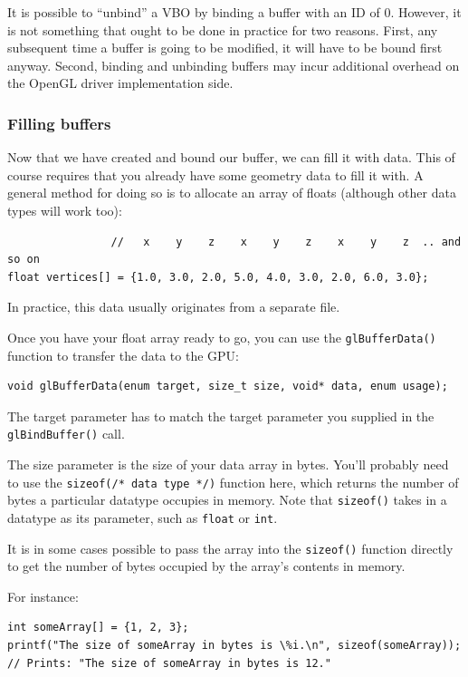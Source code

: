 It is possible to ``unbind'' a VBO by binding a buffer with an ID of 0. However, it is not something that ought to be done in practice for two reasons. First, any subsequent time a buffer is going to be modified, it will have to be bound first anyway. Second, binding and unbinding buffers may incur additional overhead on the OpenGL driver implementation side.

\subsubsection{Filling buffers}

Now that we have created and bound our buffer, we can fill it with data. This of course requires that you already have some geometry data to fill it with. A general method for doing so is to allocate an array of floats (although other data types will work too):
\begin{verbatim}
                //   x    y    z    x    y    z    x    y    z  .. and so on
float vertices[] = {1.0, 3.0, 2.0, 5.0, 4.0, 3.0, 2.0, 6.0, 3.0};
\end{verbatim}

In practice, this data usually originates from a separate file. 

Once you have your float array ready to go, you can use the \texttt{glBufferData()} function to transfer the data to the GPU:

\begin{verbatim}
void glBufferData(enum target, size_t size, void* data, enum usage);
\end{verbatim}

The target parameter has to match the target parameter you supplied in the \texttt{glBindBuffer()} call.

The size parameter is the size of your data array in bytes. You'll probably need to use the \texttt{sizeof(/* data type */)} function here, which returns the number of bytes a particular datatype occupies in memory. Note that \texttt{sizeof()} takes in a datatype as its parameter, such as \texttt{float} or \texttt{int}. 

It is in some cases possible to pass the array into the \texttt{sizeof()} function directly to get the number of bytes occupied by the array's contents in memory.

For instance:

\begin{verbatim}
int someArray[] = {1, 2, 3};
printf("The size of someArray in bytes is \%i.\n", sizeof(someArray));
// Prints: "The size of someArray in bytes is 12."
\end{verbatim}


